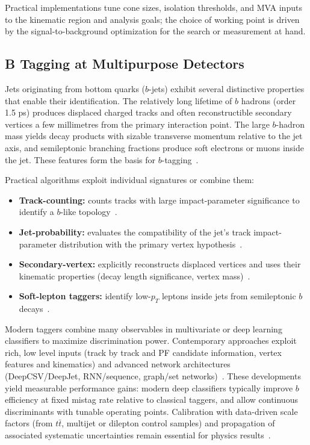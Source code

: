 Practical implementations tune cone sizes, isolation thresholds, and MVA inputs to the kinematic region and analysis goals; the choice of working point is driven by the signal-to-background optimization for the search or measurement at hand.


\subsection{B Tagging at Multipurpose Detectors}

Jets originating from bottom quarks ($b$-jets) exhibit several distinctive properties that enable their identification. The relatively long lifetime of $b$ hadrons (order 1.5 ps) produces displaced charged tracks and often reconstructible secondary vertices a few millimetres from the primary interaction point. The large $b$-hadron mass yields decay products with sizable transverse momentum relative to the jet axis, and semileptonic branching fractions produce soft electrons or muons inside the jet. These features form the basis for $b$-tagging~\cite{CMS_BTV2016}.

Practical algorithms exploit individual signatures or combine them:
\begin{itemize}
  \item \textbf{Track-counting:} counts tracks with large impact-parameter significance to identify a $b$-like topology~\cite{CMS_BTV2016}.
  \item \textbf{Jet-probability:} evaluates the compatibility of the jet's track impact-parameter distribution with the primary vertex hypothesis~\cite{CMS_BTV2016}.
  \item \textbf{Secondary-vertex:} explicitly reconstructs displaced vertices and uses their kinematic properties (decay length significance, vertex mass)~\cite{CMS_BTV2016}.
  \item \textbf{Soft-lepton taggers:} identify low-$p_T$ leptons inside jets from semileptonic $b$ decays~\cite{CMS_BTV2016}.
\end{itemize}

Modern taggers combine many observables in multivariate or deep learning classifiers to maximize discrimination power. Contemporary approaches exploit rich, low level inputs (track by track and PF candidate information, vertex features and kinematics) and advanced network architectures (DeepCSV/DeepJet, RNN/sequence, graph/set networks)~\cite{CMS_BTV2016,Bols_2020,ATLAS:2022fgo}. These developments yield measurable performance gains: modern deep classifiers typically improve $b$ efficiency at fixed mistag rate relative to classical taggers, and allow continuous discriminants with tunable operating points. Calibration with data-driven scale factors (from $t\bar t$, multijet or dilepton control samples) and propagation of associated systematic uncertainties remain essential for physics results~\cite{CMS_BTV2016}.


